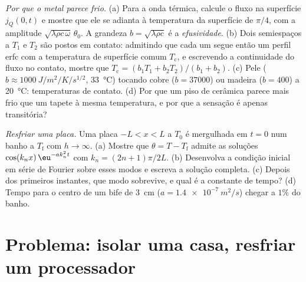 \begin{exercise}[$\star\star\star$]\label{exo:b2:heat-conduction:11}
\emph{Por que o metal parece frio.} (a) Para a onda térmica, calcule o
fluxo na superfície $j_Q(0,t)$ e mostre que ele se adianta à temperatura da superfície de
$\pi/4$, com a amplitude $\sqrt{\lambda\rho c\,\omega}\,\theta_0$. A
grandeza $b = \sqrt{\lambda\rho c}$ é a \emph{efusividade}. (b) Dois
semiespaços a $T_1$ e $T_2$ são postos em contato: admitindo que
cada um segue então um perfil erfc com a temperatura de superfície comum
$T_{\text{c}}$, e escrevendo a continuidade do fluxo no contato,
mostre que $T_{\text{c}} = (b_1T_1 + b_2T_2)/(b_1 + b_2)$. (c) Pele
($b \approx \qty{1000}{J/m^2/K/s^{1/2}}$, \qty{33}{\celsius}) tocando
cobre ($b = 37000$) ou madeira ($b = 400$) a \qty{20}{\celsius}: temperaturas
de contato. (d) Por que um piso de cerâmica parece mais frio que um tapete à
mesma temperatura, e por que a sensação é apenas transitória?
\end{exercise}

\begin{exercise}[$\star\star\star$]\label{exo:b2:heat-conduction:12}
\emph{Resfriar uma placa.} Uma placa $-L < x < L$ a $T_0$ é mergulhada em $t =
0$ num banho a $T_{\text{f}}$ com $h \to \infty$. (a) Mostre que $\theta =
T - T_{\text{f}}$ admite as soluções $\cos(k_nx)\,\eu^{-ak_n^2t}$ com $k_n
= (2n+1)\pi/2L$. (b) Desenvolva a condição inicial em série de Fourier
sobre esses modos e escreva a solução completa. (c) Depois dos primeiros
instantes, que modo sobrevive, e qual é a constante de tempo? (d) Tempo
para o centro de um bife de \qty{3}{cm} ($a = \qty{1.4e-7}{m^2/s}$) chegar
a $1\%$ do banho.
\end{exercise}

\section{Problema: isolar uma casa, resfriar um processador}

